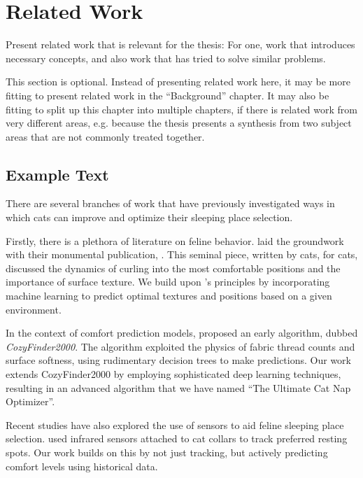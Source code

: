 \chapter{Related Work}\label{chap:related}

Present related work that is relevant for the thesis:
For one, work that introduces necessary concepts, and also work that has tried to solve similar problems.

This section is optional.
Instead of presenting related work here, it may be more fitting to present related work in the ``Background'' chapter.
It may also be fitting to split up this chapter into multiple chapters, if there is related work from very different areas, e.g. because the thesis presents a synthesis from two subject areas that are not commonly treated together.

\section{Example Text}

There are several branches of work that have previously investigated ways in which cats can improve and optimize their sleeping place selection.

Firstly, there is a plethora of literature on feline behavior.
\citet{whiskers1997art} laid the groundwork with their monumental publication, .
This seminal piece, written by cats, for cats, discussed the dynamics of curling into the most comfortable positions and the importance of surface texture.
We build upon \citeauthor{whiskers1997art}'s principles by incorporating machine learning to predict optimal textures and positions based on a given environment.

In the context of comfort prediction models, \citet{fluffytail2002cozyfinder} proposed an early algorithm, dubbed \emph{CozyFinder2000}.
The algorithm exploited the physics of fabric thread counts and surface softness, using rudimentary decision trees to make predictions.
Our work extends CozyFinder2000 by employing sophisticated deep learning techniques, resulting in an advanced algorithm that we have named “The Ultimate Cat Nap Optimizer”.

Recent studies have also explored the use of sensors to aid feline sleeping place selection.
\citet{paws2019tracking} used infrared sensors attached to cat collars to track preferred resting spots.
Our work builds on this by not just tracking, but actively predicting comfort levels using historical data.


